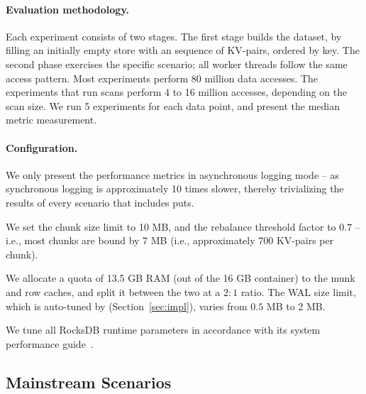 \paragraph{Evaluation methodology.} Each experiment consists of two stages. The first stage builds 
the dataset, by filling an initially empty store with an sequence of KV-pairs, ordered by key. The second 
phase exercises the specific scenario; all worker threads follow the same access pattern. Most experiments 
perform 80 million data accesses. The experiments that run scans perform 4 to 16 million accesses, depending 
on the scan size. We run 5 experiments for each data point, and present the median metric measurement. 

\paragraph{Configuration.} 
We only present the performance metrics in asynchronous logging mode -- as synchronous logging 
is approximately 10 times slower, thereby trivializing the results of every scenario that includes puts. 

We set the \sys\/ chunk size limit to 10 MB, and the rebalance threshold factor to $0.7$ -- i.e., 
most chunks are bound by 7 MB (i.e., approximately 700 KV-pairs per chunk). 

We allocate a quota of 13.5 GB RAM (out of the 16 GB container) to the munk and row caches, 
and split it between the two at a $2:1$ ratio. The WAL size limit, which is auto-tuned by \sys\/
(Section~\ref{sec:impl}), varies from $0.5$ MB to 2 MB. 

We tune all RocksDB runtime parameters in accordance with its system performance guide~\cite{RocksDBPerf}.   

\subsection{Mainstream Scenarios}

